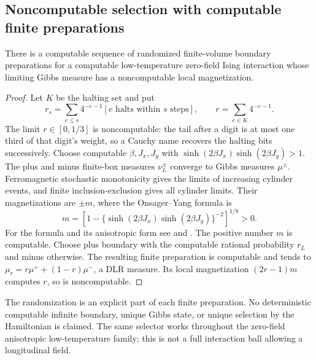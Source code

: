 \subsection{Noncomputable selection with computable finite preparations}
\begin{proposition}\label{prop:state-selection}
There is a computable sequence of randomized finite-volume boundary
preparations for a computable low-temperature zero-field Ising
interaction whose limiting Gibbs measure has a noncomputable local
magnetization.
\end{proposition}
\begin{proof}
Let $K$ be the halting set and put
\[
 r_s=\sum_{e\leq s}4^{-e-1}[e\text{ halts within }s\text{ steps}],
 \qquad r=\sum_{e\in K}4^{-e-1}.
\]
The limit $r\in[0,1/3]$ is noncomputable: the tail after a digit
is at most one third of that digit's weight, so a Cauchy name
recovers the halting bits successively. Choose computable
$\beta,J_x,J_y$ with
$\sinh(2\beta J_x)\sinh(2\beta J_y)>1$.
The plus and minus finite-box measures $\nu_L^\pm$ converge to
Gibbs measures $\mu^\pm$. Ferromagnetic stochastic monotonicity
gives the limits of increasing cylinder events, and finite
inclusion-exclusion gives all cylinder limits. Their magnetizations
are $\pm m$, where the Onsager--Yang formula is
\[
 m=\left[1-
  \{\sinh(2\beta J_x)\sinh(2\beta J_y)\}^{-2}\right]^{1/8}>0.
\]
For the formula and its anisotropic form see
\cite[equations~(2.1)--(2.2)]{baxterMagnetization} and
\cite{yangMagnetization}. The positive number $m$ is computable.
Choose plus boundary with the computable rational probability $r_L$
and minus otherwise. The resulting finite preparation is computable
and tends to $\mu_r=r\mu^++(1-r)\mu^-$, a DLR measure. Its local
magnetization $(2r-1)m$ computes $r$, so is noncomputable.
\end{proof}
The randomization is an explicit part of each finite preparation.
No deterministic computable infinite boundary, unique Gibbs state,
or unique selection by the Hamiltonian is claimed. The same selector
works throughout the zero-field anisotropic low-temperature family;
this is not a full interaction ball allowing a longitudinal field.

